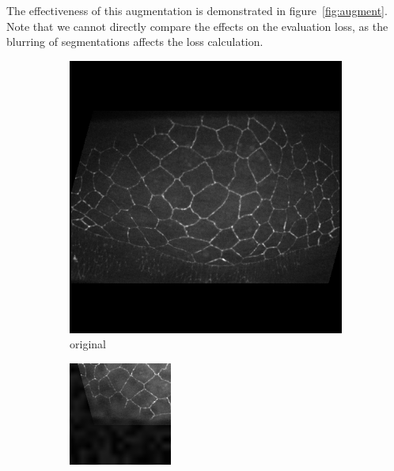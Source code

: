 \documentclass[aps,prl,twocolumn,groupedaddress,amsmath,amssymb]{revtex4-1}
\begin{document}
    The effectiveness of this augmentation is demonstrated in figure~\ref{fig:augment}. Note that we
    cannot directly compare the effects on the evaluation loss, as the blurring of segmentations
    affects the loss calculation.

    \begin{figure}[tbp]
        \begin{subfigure}[c]{0.45\linewidth}
            \includegraphics[width=\linewidth]{figures/original.png}
            \caption{original}
        \end{subfigure}
        \begin{subfigure}[c]{0.45\linewidth}
            \includegraphics[width=\linewidth]{figures/augmented.png}

\end{subfigure}
\end{figure}
\end{document}
